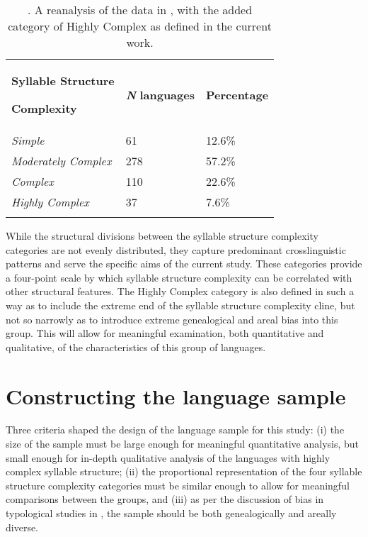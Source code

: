 \begin{table}
\begin{tabularx}{\textwidth}{XXX}
\lsptoprule

\textbf{Syllable Structure} 

\textbf{Complexity} & \textbf{\textit{N}} \textbf{languages} & \textbf{Percentage}\\
\textit{Simple} & 61 & 12.6\%\\
\textit{Moderately Complex} & 278 & 57.2\%\\
\textit{Complex} & 110 & 22.6\%\\
\textit{Highly Complex} & 37 & 7.6\%\\
\lspbottomrule
\end{tabularx}
\caption{\label{tab:2.3}. A reanalysis of the data in \citet{Maddieson2013a}, with the added category of Highly Complex as defined in the current work.}
\end{table}

  While the structural divisions between the syllable structure complexity categories are not evenly distributed, they capture predominant crosslinguistic patterns and serve the specific aims of the current study. These categories provide a four-point scale by which syllable structure complexity can be correlated with other structural features. The Highly Complex category is also defined in such a way as to include the extreme end of the syllable structure complexity cline, but not so narrowly as to introduce extreme genealogical and areal bias into this group. This will allow for meaningful examination, both quantitative and qualitative, of the characteristics of this group of languages.

\section{Constructing the language sample}\label{sec:2.3}

  Three criteria shaped the design of the language sample for this study: (i) the size of the sample must be large enough for meaningful quantitative analysis, but small enough for in-depth qualitative analysis of the languages with highly complex syllable structure; (ii) the proportional representation of the four syllable structure complexity categories must be similar enough to allow for meaningful comparisons between the groups, and (iii) as per the discussion of bias in typological studies in , the sample should be both genealogically and areally diverse.

